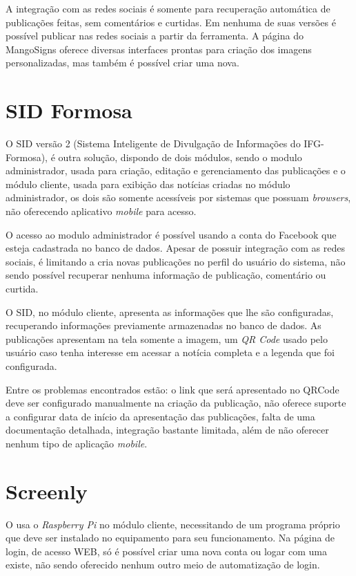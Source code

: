 A integração com as redes sociais é somente para recuperação automática de publicações feitas, sem comentários e curtidas. Em nenhuma de suas versões é possível publicar nas redes sociais a partir da ferramenta. A página do MangoSigns oferece diversas interfaces prontas para criação dos imagens personalizadas, mas também é possível criar uma nova. 

\section{SID Formosa}
\label{sec:sid}
O SID versão 2 (Sistema Inteligente de Divulgação de Informações do IFG-Formosa), é outra solução, dispondo de dois módulos, sendo o modulo administrador, usada para criação, editação e gerenciamento das publicações e o módulo cliente, usada para exibição das notícias criadas no módulo administrador, os dois são somente acessíveis por sistemas que possuam \textit{browsers}, não oferecendo aplicativo \textit{mobile} para acesso.

O acesso ao modulo administrador é possível usando a conta do Facebook que esteja cadastrada no banco de dados. Apesar de possuir integração com as redes sociais, é limitando a cria novas publicações no perfil do usuário do sistema, não sendo possível recuperar nenhuma informação de publicação, comentário ou curtida.

O SID, no módulo cliente, apresenta as informações que lhe são configuradas, recuperando informações previamente armazenadas no banco de dados. As publicações apresentam na tela somente a imagem, um \textit{QR Code} usado pelo usuário caso tenha interesse em acessar a notícia completa e a legenda que foi configurada. \cite{sobrinho2017}

Entre os problemas encontrados estão: o link que será apresentado no QRCode deve ser configurado manualmente na criação da publicação, não oferece suporte a configurar data de início da apresentação das publicações, falta de uma documentação detalhada, integração bastante limitada, além de não oferecer nenhum tipo de aplicação \textit{mobile}.

\section{Screenly}
O \cite{screenly2017} usa o \textit{Raspberry Pi} no módulo cliente, necessitando de um programa próprio que deve ser instalado no equipamento para seu funcionamento. Na página de login, de acesso WEB, só é possível criar uma nova conta ou logar com uma existe, não sendo oferecido nenhum outro meio de automatização de login. 

